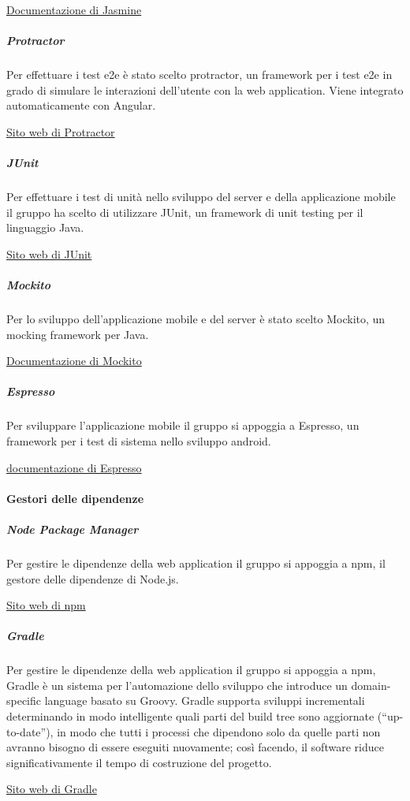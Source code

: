 \documentclass[../../norme-di-progetto.tex]{subfiles}
\begin{document}
\href{https://jasmine.github.io/}{Documentazione di Jasmine}

\subparagraph{Protractor}%
\label{subp:protractor}
Per effettuare i test e2e è stato scelto protractor, un framework per i test e2e in grado di simulare le interazioni dell'utente con la web application.
Viene integrato automaticamente con Angular.

\href{https://www.protractortest.org/}{Sito web di Protractor}

\subparagraph{JUnit}%
\label{subp:junit}
Per effettuare i test di unità nello sviluppo del server e della applicazione mobile il gruppo ha scelto di utilizzare JUnit, un framework di unit testing per il linguaggio Java.

\href{https://junit.org/junit4/}{Sito web di JUnit}

\subparagraph{Mockito}%
\label{subp:mockito}
Per lo sviluppo dell'applicazione mobile e del server è stato scelto Mockito, un mocking framework per Java.

\href{https://site.mockito.org/}{Documentazione di Mockito}

\subparagraph{Espresso}%
\label{subp:espresso}
Per sviluppare l'applicazione mobile il gruppo si appoggia a Espresso, un framework per i test di sistema nello sviluppo android.

\href{https://developer.android.com/training/testing/espresso}{documentazione di Espresso}


\paragraph{Gestori delle dipendenze}%
\label{par:gestori_dipendenze}

\subparagraph{Node Package Manager}%
\label{subp:npm}
Per gestire le dipendenze della web application il gruppo si appoggia a npm, il gestore delle dipendenze di Node.js.

\href{https://www.npmjs.com/}{Sito web di npm}

\subparagraph{Gradle}%
\label{subp:gradle}
Per gestire le dipendenze della web application il gruppo si appoggia a npm,
Gradle è un sistema per l'automazione dello sviluppo che introduce un domain-specific language basato su Groovy.
Gradle supporta sviluppi incrementali determinando in modo intelligente quali parti del build tree sono aggiornate (``up-to-date''), in modo che tutti i processi che dipendono solo da quelle parti non avranno bisogno di essere eseguiti nuovamente; così facendo, il software riduce significativamente il tempo di costruzione del progetto.

\href{https://gradle.org/}{Sito web di Gradle}
\end{document}

